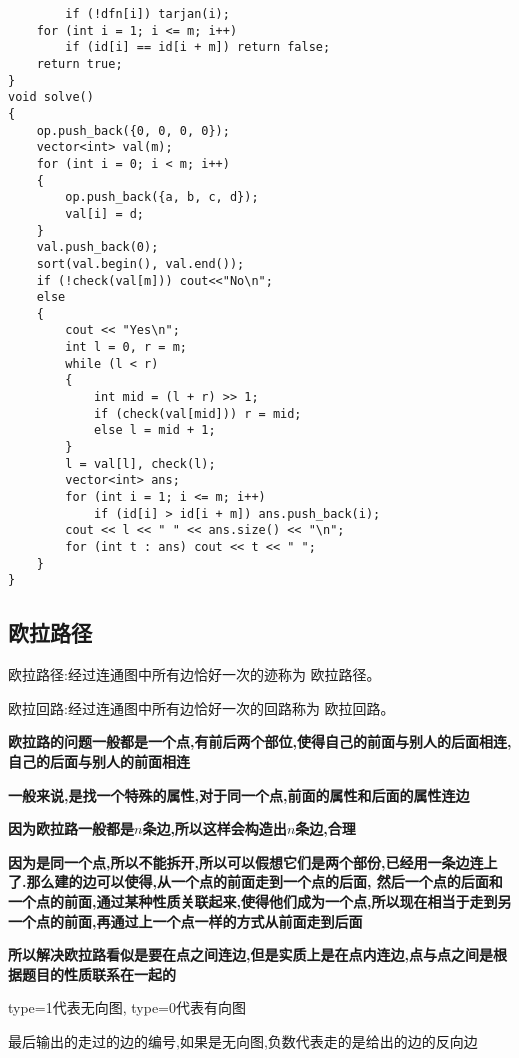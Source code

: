 \documentclass[a4paper, fontset=none]{ctexart}
\begin{document}
\begin{verbatim}
        if (!dfn[i]) tarjan(i);
    for (int i = 1; i <= m; i++)
        if (id[i] == id[i + m]) return false;
    return true;
}
void solve()
{
    op.push_back({0, 0, 0, 0});
    vector<int> val(m);
    for (int i = 0; i < m; i++)
    {
        op.push_back({a, b, c, d});
        val[i] = d;
    }
    val.push_back(0);
    sort(val.begin(), val.end());
    if (!check(val[m])) cout<<"No\n";
    else
    {
        cout << "Yes\n";
        int l = 0, r = m;
        while (l < r)
        {
            int mid = (l + r) >> 1;
            if (check(val[mid])) r = mid;
            else l = mid + 1;
        }
        l = val[l], check(l);
        vector<int> ans;
        for (int i = 1; i <= m; i++)
            if (id[i] > id[i + m]) ans.push_back(i);
        cout << l << " " << ans.size() << "\n";
        for (int t : ans) cout << t << " ";
    }
}
\end{verbatim}

\subsection{欧拉路径}

欧拉路径:经过连通图中所有边恰好一次的迹称为 欧拉路径。

欧拉回路:经过连通图中所有边恰好一次的回路称为 欧拉回路。

\textbf{欧拉路的问题一般都是一个点,有前后两个部位,使得自己的前面与别人的后面相连,自己的后面与别人的前面相连}

\textbf{一般来说,是找一个特殊的属性,对于同一个点,前面的属性和后面的属性连边}

\textbf{因为欧拉路一般都是$n$条边,所以这样会构造出$n$条边,合理}

\textbf{因为是同一个点,所以不能拆开,所以可以假想它们是两个部份,已经用一条边连上了.那么建的边可以使得,从一个点的前面走到一个点的后面,
然后一个点的后面和一个点的前面,通过某种性质关联起来,使得他们成为一个点,所以现在相当于走到另一个点的前面,再通过上一个点一样的方式从前面走到后面}

\textbf{所以解决欧拉路看似是要在点之间连边,但是实质上是在点内连边,点与点之间是根据题目的性质联系在一起的}

type=1代表无向图, type=0代表有向图

最后输出的走过的边的编号,如果是无向图,负数代表走的是给出的边的反向边
\end{document}
